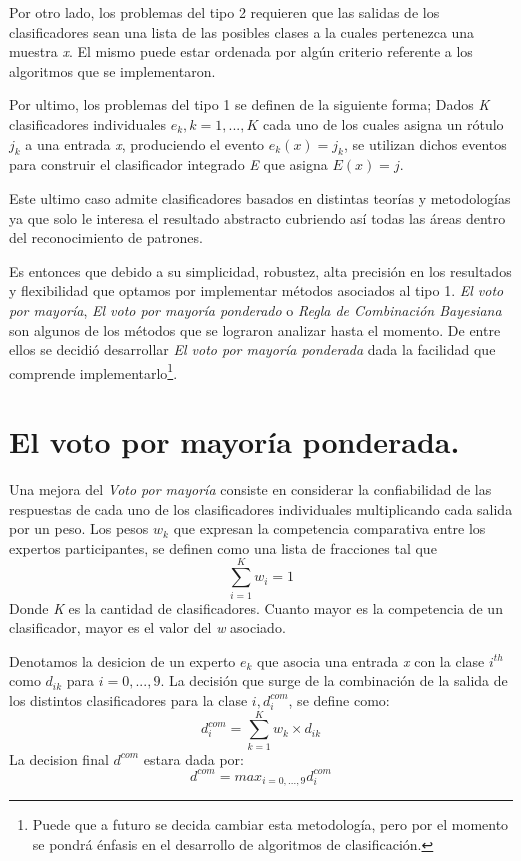 Por otro lado, los problemas del tipo 2 requieren que las salidas de los clasificadores sean una lista de las posibles clases a la cuales pertenezca una muestra \textit{x}. El mismo puede estar ordenada por algún criterio referente a los algoritmos que se implementaron.

Por ultimo, los problemas del tipo 1 se definen de la siguiente forma; Dados \textit{K} clasificadores individuales $ e_{k}, k = 1,...,K $ cada uno de los cuales asigna un rótulo $ j_{k} $ a una entrada \textit{x}, produciendo el evento $ e_{k}(x) = j_{k} $, se utilizan dichos eventos para construir el clasificador integrado \textit{E} que asigna $ E(x) = j $. 

Este ultimo caso admite clasificadores basados en distintas teorías y metodologías ya que solo le interesa el resultado abstracto cubriendo así todas las áreas dentro del reconocimiento de patrones. 

Es entonces que debido a su simplicidad, robustez, alta precisión en los resultados y flexibilidad que optamos por implementar métodos asociados al tipo 1. \textit{El voto por mayoría}, \textit{El voto por mayoría ponderado} o \textit{Regla de Combinación Bayesiana} son algunos de los métodos que se lograron analizar hasta el momento. De entre ellos se decidió desarrollar \textit{El voto por mayoría ponderada} dada la facilidad que comprende implementarlo\footnote{Puede que a futuro se decida cambiar esta metodología, pero por el momento se pondrá énfasis en el desarrollo de algoritmos de clasificación.}.

\section{El voto por mayoría ponderada.}
Una mejora del \textit{Voto por mayoría} consiste en considerar la confiabilidad de las respuestas de cada uno de los clasificadores individuales multiplicando cada salida por un peso. Los pesos $ w_{k} $ que expresan la competencia comparativa entre los expertos participantes, se definen como una lista de fracciones tal que
\[ \sum_{i=1}^{K}w_{i} = 1 \]
Donde \textit{K} es la cantidad de clasificadores. Cuanto mayor es la competencia de un clasificador, mayor es el valor del \textit{w} asociado.

Denotamos la desicion de un experto $ e_{k} $ que asocia una entrada \textit{x} con la clase $ i^{th} $ como $ d_{ik} $ para $ i = 0,...,9 $. La decisión que surge de la combinación de la salida de los distintos clasificadores para la clase $ i, d_{i}^{com} $, se define como:
\[ d_{i}^{com} = \sum_{k=1}^{K}w_{k} \times d_{ik} \]
La decision final $ d^{com} $ estara dada por:
\[ d^{com} = max_{i = 0,...,9} d_{i}^{com} \]
